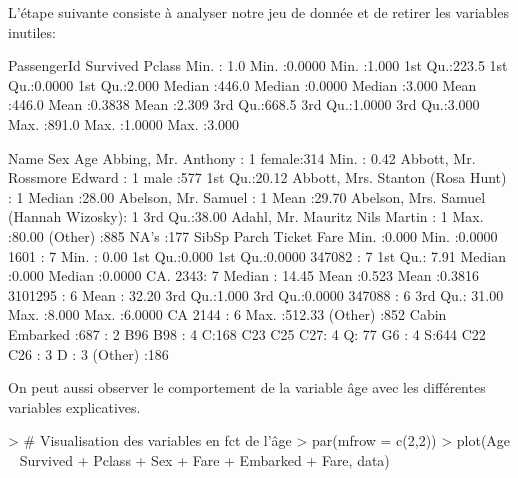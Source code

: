 \documentclass[11pt,french]{report}
\begin{document}
L'étape suivante consiste à analyser notre jeu de donnée et de retirer les variables inutiles:
\begin{Schunk}
\begin{Soutput}
  PassengerId       Survived          Pclass     
 Min.   :  1.0   Min.   :0.0000   Min.   :1.000  
 1st Qu.:223.5   1st Qu.:0.0000   1st Qu.:2.000  
 Median :446.0   Median :0.0000   Median :3.000  
 Mean   :446.0   Mean   :0.3838   Mean   :2.309  
 3rd Qu.:668.5   3rd Qu.:1.0000   3rd Qu.:3.000  
 Max.   :891.0   Max.   :1.0000   Max.   :3.000  
                                                 
                                    Name         Sex           Age       
 Abbing, Mr. Anthony                  :  1   female:314   Min.   : 0.42  
 Abbott, Mr. Rossmore Edward          :  1   male  :577   1st Qu.:20.12  
 Abbott, Mrs. Stanton (Rosa Hunt)     :  1                Median :28.00  
 Abelson, Mr. Samuel                  :  1                Mean   :29.70  
 Abelson, Mrs. Samuel (Hannah Wizosky):  1                3rd Qu.:38.00  
 Adahl, Mr. Mauritz Nils Martin       :  1                Max.   :80.00  
 (Other)                              :885                NA's   :177    
     SibSp           Parch             Ticket         Fare       
 Min.   :0.000   Min.   :0.0000   1601    :  7   Min.   :  0.00  
 1st Qu.:0.000   1st Qu.:0.0000   347082  :  7   1st Qu.:  7.91  
 Median :0.000   Median :0.0000   CA. 2343:  7   Median : 14.45  
 Mean   :0.523   Mean   :0.3816   3101295 :  6   Mean   : 32.20  
 3rd Qu.:1.000   3rd Qu.:0.0000   347088  :  6   3rd Qu.: 31.00  
 Max.   :8.000   Max.   :6.0000   CA 2144 :  6   Max.   :512.33  
                                  (Other) :852                   
         Cabin     Embarked
            :687    :  2   
 B96 B98    :  4   C:168   
 C23 C25 C27:  4   Q: 77   
 G6         :  4   S:644   
 C22 C26    :  3           
 D          :  3           
 (Other)    :186           
\end{Soutput}
\end{Schunk}
\bigskip
On peut aussi observer le comportement de la variable âge avec les différentes variables explicatives.
\begin{Schunk}
\begin{Sinput}
> # Visualisation des variables en fct de l'âge
> par(mfrow = c(2,2))
> plot(Age ~ Survived + Pclass + Sex + Fare + Embarked + Fare, data)
\end{Sinput}
\end{Schunk}
\end{document}
